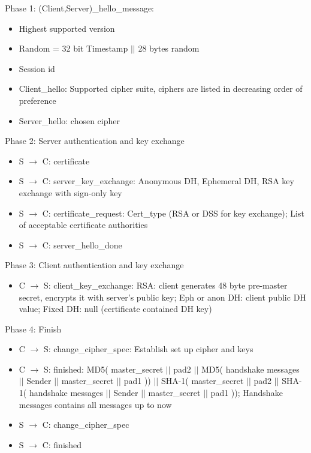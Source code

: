 \documentclass[fs, footer]{latex4ei}
\begin{document}
\begin{multicols*}{4}
{Phase 1: (Client,Server)\_hello\_message:
\begin{itemize}
	\item Highest   supported   version 
	\item Random    =   32  bit Timestamp  $||$  28  bytes   random  
	\item Session   id  
	\item Client\_hello: Supported   cipher  suite,  ciphers are listed  
	in  decreasing  order   of  preference  
	\item Server\_hello: chosen  cipher  
\end{itemize}
 
Phase 2:  Server  authentication    and key exchange
\begin{itemize}
	\item S $\rightarrow$ C:  certificate  
	\item S $\rightarrow$ C:  server\_key\_exchange: Anonymous DH, Ephemeral   DH, RSA key exchange    with    sign-only   key 
	\item S $\rightarrow$ C:  certificate\_request: Cert\_type (RSA    or  DSS for key exchange); List  of  acceptable  certificate  authorities  
	\item S $\rightarrow$ C:  server\_hello\_done
\end{itemize}

Phase 3:  Client  authentication and key exchange 
\begin{itemize}
	\item C $\rightarrow$ S: client\_key\_exchange: RSA: client generates 48  byte pre-master  secret, encrypts it  with server’s 
	public  key; Eph or  anon DH: client  public  DH  value; Fixed DH: null (certificate contained DH  key)   
\end{itemize}

Phase 4: Finish 
\begin{itemize}
	\item C $\rightarrow$ S: change\_cipher\_spec: Establish set up cipher and keys 
	\item C $\rightarrow$ S: finished: MD5( master\_secret $||$ pad2 $||$ MD5( handshake messages $||$ Sender $||$ master\_secret $||$ pad1 )) $||$ SHA-1( master\_secret $||$ pad2 $||$ SHA-1( handshake messages $||$ Sender $||$ master\_secret $||$ pad1 )); Handshake messages contains all messages up to now 
	\item S $\rightarrow$ C: change\_cipher\_spec
	\item S $\rightarrow$ C: finished 
\end{itemize}
}

\end{multicols*}
\end{document}
